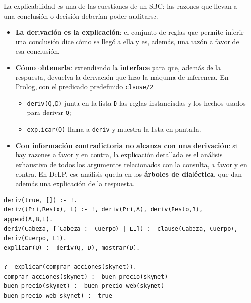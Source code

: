 \documentclass[11pt,a4paper]{article}
\begin{document}
La explicabilidad es una de las cuestiones de un SBC: las razones que llevan a una conclusión o decisión deberían poder auditarse.
\begin{itemize}
  \item \textbf{La derivación es la explicación}: el conjunto de reglas que permite inferir una conclusión dice cómo se llegó a ella y es, además, una razón a favor de esa conclusión.
  \item \textbf{Cómo obtenerla}: extendiendo la \textbf{interface} para que, además de la respuesta, devuelva la derivación que hizo la máquina de inferencia. En Prolog, con el predicado predefinido \texttt{clause/2}:
  \begin{itemize}
    \item \texttt{deriv(Q,D)} junta en la lista \texttt{D} las reglas instanciadas y los hechos usados para derivar \texttt{Q};
    \item \texttt{explicar(Q)} llama a \texttt{deriv} y muestra la lista en pantalla.
  \end{itemize}
  \item \textbf{Con información contradictoria no alcanza con una derivación}: si hay razones a favor y en contra, la explicación detallada es el análisis exhaustivo de todos los argumentos relacionados con la consulta, a favor y en contra. En DeLP, ese análisis queda en los \textbf{árboles de dialéctica}, que dan además una explicación de la respuesta.
\end{itemize}

\begin{codigo}
\begin{verbatim}
deriv(true, []) :- !.
deriv((Pri,Resto), L) :- !, deriv(Pri,A), deriv(Resto,B), append(A,B,L).
deriv(Cabeza, [(Cabeza :- Cuerpo) | L1]) :- clause(Cabeza, Cuerpo), deriv(Cuerpo, L1).
explicar(Q) :- deriv(Q, D), mostrar(D).

?- explicar(comprar_acciones(skynet)).
comprar_acciones(skynet) :- buen_precio(skynet)
buen_precio(skynet) :- buen_precio_web(skynet)
buen_precio_web(skynet) :- true
\end{verbatim}
\end{codigo}
\end{document}
